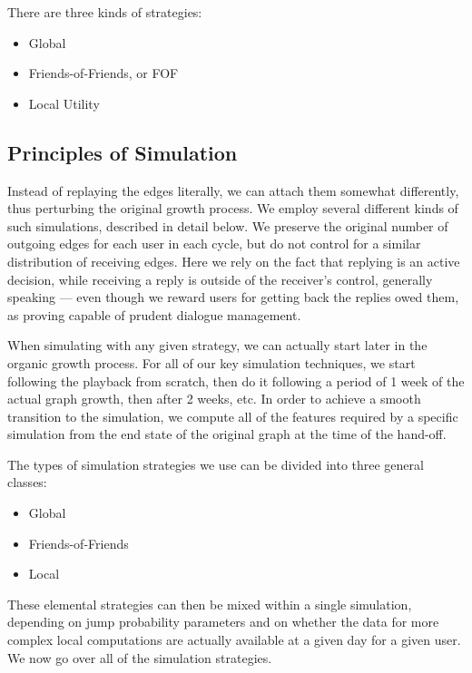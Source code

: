 \documentclass[10pt,oneside]{memoir}
\begin{document}
There are three kinds of strategies:


\begin{itemize}


\item Global

\item Friends-of-Friends, or FOF

\item Local Utility
\end{itemize}

\subsection{Principles of Simulation}
\label{principlesofsimulation}

Instead of replaying the edges literally, we can attach them somewhat differently, thus perturbing the original growth process.  We employ several different kinds of such simulations, described in detail below.  We preserve the original number of outgoing edges for each user in each cycle, but do not control for a similar distribution of receiving edges.  Here we rely on the fact that replying is an active decision, while receiving a reply is outside of the receiver's control, generally speaking --- even though we reward users for getting back the replies owed them, as proving capable of prudent dialogue management.


When simulating with any given strategy, we can actually start later in the organic growth process.  For all of our key simulation techniques, we start following the playback from scratch, then do it following a period of 1 week of the actual graph growth, then after 2 weeks, etc.  In order to achieve a smooth transition to the simulation, we compute all of the features required by a specific simulation from the end state of the original graph at the time of the hand-off.


The types of simulation strategies we use can be divided into three general classes:


\begin{itemize}


\item Global

\item Friends-of-Friends

\item Local
\end{itemize}

These elemental strategies can then be mixed within a single simulation, depending on jump probability parameters and on whether the data for more complex local computations are actually available at a given day for a given user.  We now go over all of the simulation strategies.
\end{document}

